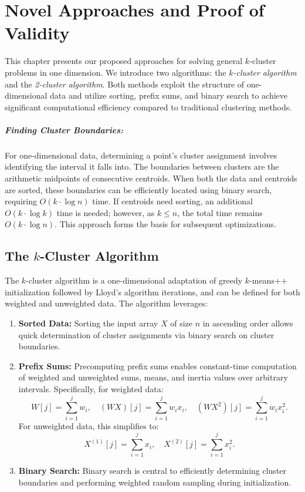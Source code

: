 \chapter{Novel Approaches and Proof of Validity}\label{chap:algorithms}

This chapter presents our proposed approaches for solving general \(k\)-cluster problems in one dimension. We introduce two algorithms: the \textit{\(k\)-cluster algorithm} and the \textit{2-cluster algorithm}. Both methods exploit the structure of one-dimensional data and utilize sorting, prefix sums, and binary search to achieve significant computational efficiency compared to traditional clustering methods.

\paragraph{Finding Cluster Boundaries:}
For one-dimensional data, determining a point's cluster assignment involves identifying the interval it falls into. The boundaries between clusters are the arithmetic midpoints of consecutive centroids. When both the data and centroids are sorted, these boundaries can be efficiently located using binary search, requiring $O(k \cdot \log n)$ time. If centroids need sorting, an additional $O(k \cdot \log k)$ time is needed; however, as $k \leq n$, the total time remains $O(k \cdot \log n)$. This approach forms the basis for subsequent optimizations.

\section{The \(k\)-Cluster Algorithm}\label{sec:k_cluster_algorithm}

The \(k\)-cluster algorithm is a one-dimensional adaptation of greedy $k$-means++ initialization followed by Lloyd’s algorithm iterations, and can be defined for both weighted and unweighted data. The algorithm leverages:

\begin{enumerate}
    \item \textbf{Sorted Data:} Sorting the input array \(X\) of size \(n\) in ascending order allows quick determination of cluster assignments via binary search on cluster boundaries.
    \item \textbf{Prefix Sums:} Precomputing prefix sums enables constant-time computation of weighted and unweighted sums, means, and inertia values over arbitrary intervals. Specifically, for weighted data:
    \[
    W[j] = \sum_{i=1}^j w_i, \quad 
    (WX)[j] = \sum_{i=1}^j w_i x_i, \quad 
    (WX^2)[j] = \sum_{i=1}^j w_i x_i^2.
    \]
    For unweighted data, this simplifies to:
    \[
    X^{(1)}[j] = \sum_{i=1}^j x_i, \quad X^{(2)}[j] = \sum_{i=1}^j x_i^2.
    \]
    \item \textbf{Binary Search:} Binary search is central to efficiently determining cluster boundaries and performing weighted random sampling during initialization.
\end{enumerate}

